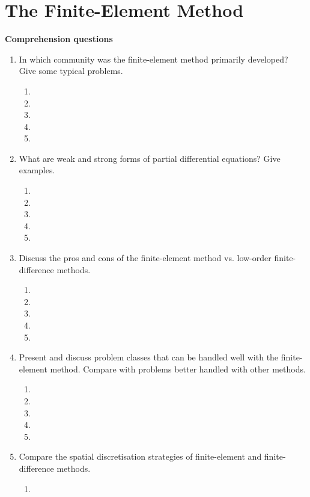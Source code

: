 
\chapter{The Finite-Element Method}

{\bf Comprehension questions}
\begin{enumerate}
\item In which community was the finite-element method primarily developed? Give some typical problems. 
\begin{enumerate}
\item[]
\item[]
\item[] 
\item[]
\item[] 
\end{enumerate}
\item What are weak and strong forms of partial differential equations? Give examples. 
\begin{enumerate}
\item[]
\item[]
\item[] 
\item[]
\item[] 
\end{enumerate}
\item Discuss the pros and cons of the finite-element method vs. low-order finite-difference methods. 
\begin{enumerate}
\item[]
\item[]
\item[] 
\item[]
\item[] 
\end{enumerate}
\item Present and discuss problem classes that can be handled well with the finite-element method. Compare with problems better handled with other methods. 
\begin{enumerate}
\item[]
\item[]
\item[] 
\item[]
\item[] 
\end{enumerate}
\item Compare the spatial discretisation strategies of finite-element and finite-difference methods. 
\begin{enumerate}
\item[]

\end{enumerate}
\end{enumerate}
